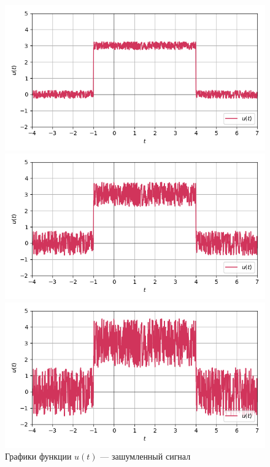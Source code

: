 \documentclass[a4paper]{article}
\begin{document}
\begin{figure}[H]
    \begin{minipage}{0.33\textwidth}
        \centering \includegraphics[width=\textwidth]{sources/low-pass filter/noisy (b=0.5).png}
        \caption{$b = 0.5$}
    \end{minipage}\hfill
    \begin{minipage}{0.33\textwidth}
        \centering \includegraphics[width=\textwidth]{sources/low-pass filter/noisy (b=1.5).png}
        \caption{$b = 1.5$}
    \end{minipage}\hfill
    \begin{minipage}{0.33\textwidth}
        \centering \includegraphics[width=\textwidth]{sources/low-pass filter/noisy (b=3).png}
        \caption{$b = 3$}
    \end{minipage}
    \caption*{Графики функции $u(t)$ --- зашумленный сигнал}
\end{figure}
\end{document}

